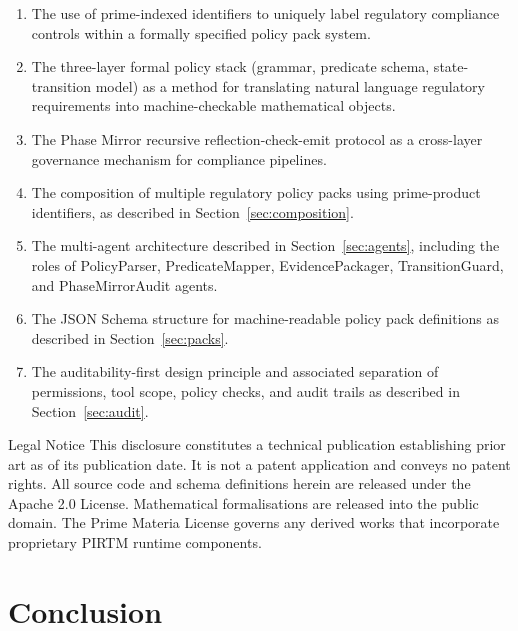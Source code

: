 \documentclass[12pt,letterpaper]{article}
\theoremstyle{definition}
\theoremstyle{plain}
\theoremstyle{remark}
\begin{document}
\begin{enumerate}
  \item The use of prime-indexed identifiers to uniquely label regulatory
  compliance controls within a formally specified policy pack system.

  \item The three-layer formal policy stack (grammar, predicate schema,
  state-transition model) as a method for translating natural language regulatory
  requirements into machine-checkable mathematical objects.

  \item The Phase Mirror recursive reflection-check-emit protocol as a
  cross-layer governance mechanism for compliance pipelines.

  \item The composition of multiple regulatory policy packs using prime-product
  identifiers, as described in Section~\ref{sec:composition}.

  \item The multi-agent architecture described in Section~\ref{sec:agents},
  including the roles of PolicyParser, PredicateMapper, EvidencePackager,
  TransitionGuard, and PhaseMirrorAudit agents.

  \item The JSON Schema structure for machine-readable policy pack definitions as
  described in Section~\ref{sec:packs}.

  \item The auditability-first design principle and associated separation of
  permissions, tool scope, policy checks, and audit trails as described in
  Section~\ref{sec:audit}.
\end{enumerate}

\begin{warnbox}{Legal Notice}
This disclosure constitutes a technical publication establishing prior art as of
its publication date. It is not a patent application and conveys no patent
rights. All source code and schema definitions herein are released under the
Apache 2.0 License. Mathematical formalisations are released into the public
domain. The Prime Materia License governs any derived works that incorporate
proprietary PIRTM runtime components.
\end{warnbox}

\section{Conclusion}
\label{sec:conclusion}
\end{document}
